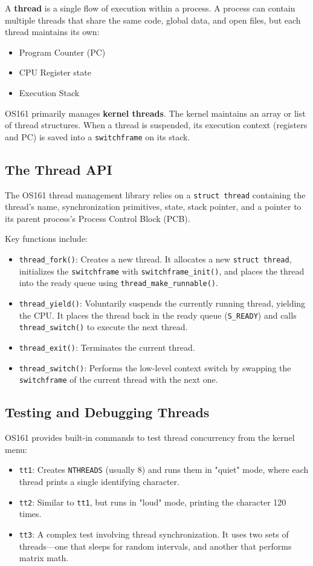 A \textbf{thread} is a single flow of execution within a process. A process can contain multiple threads that share the same code, global data, and open files, but each thread maintains its own:
\begin{itemize}
    \item Program Counter (PC)
    \item CPU Register state
    \item Execution Stack
\end{itemize}

OS161 primarily manages \textbf{kernel threads}. The kernel maintains an array or list of thread structures. When a thread is suspended, its execution context (registers and PC) is saved into a \texttt{switchframe} on its stack.

\subsection{The Thread API}
The OS161 thread management library relies on a \texttt{struct thread} containing the thread's name, synchronization primitives, state, stack pointer, and a pointer to its parent process's Process Control Block (PCB).

Key functions include:
\begin{itemize}
    \item \texttt{thread\_fork()}: Creates a new thread. It allocates a new \texttt{struct thread}, initializes the \texttt{switchframe} with \texttt{switchframe\_init()}, and places the thread into the ready queue using \texttt{thread\_make\_runnable()}.
    \item \texttt{thread\_yield()}: Voluntarily suspends the currently running thread, yielding the CPU. It places the thread back in the ready queue (\texttt{S\_READY}) and calls \texttt{thread\_switch()} to execute the next thread.
    \item \texttt{thread\_exit()}: Terminates the current thread.
    \item \texttt{thread\_switch()}: Performs the low-level context switch by swapping the \texttt{switchframe} of the current thread with the next one.
\end{itemize}

\subsection{Testing and Debugging Threads}
OS161 provides built-in commands to test thread concurrency from the kernel menu:
\begin{itemize}
    \item \texttt{tt1}: Creates \texttt{NTHREADS} (usually 8) and runs them in "quiet" mode, where each thread prints a single identifying character.
    \item \texttt{tt2}: Similar to \texttt{tt1}, but runs in "loud" mode, printing the character 120 times. 
    \item \texttt{tt3}: A complex test involving thread synchronization. It uses two sets of threads---one that sleeps for random intervals, and another that performs matrix math.
\end{itemize}


